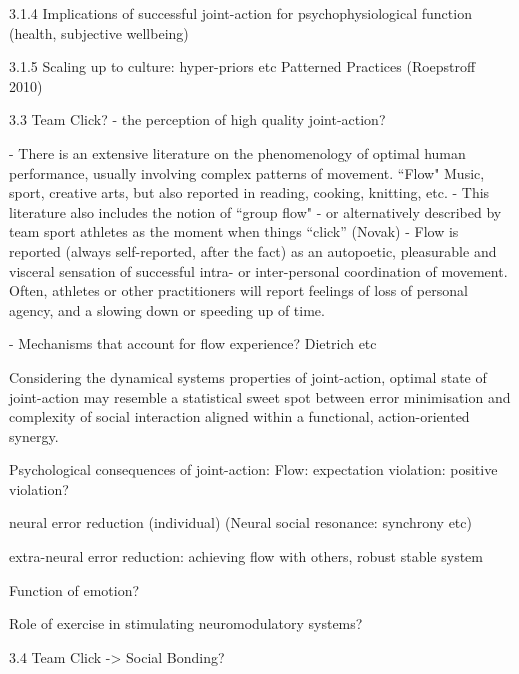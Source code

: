  3.1.4 Implications of successful joint-action for psychophysiological function (health, subjective wellbeing)


3.1.5 Scaling up to culture: hyper-priors etc Patterned Practices (Roepstroff 2010)





















3.3 Team Click? - the perception of high quality joint-action?


- There is an extensive literature on the phenomenology of optimal human performance, usually involving complex patterns of movement. ``Flow"  Music, sport, creative arts, but also reported in reading, cooking, knitting, etc.
- This literature also includes the notion of ``group flow" - or alternatively described by team sport athletes as the moment when things ``click'' (Novak)
- Flow is reported (always self-reported, after the fact) as an autopoetic, pleasurable and visceral sensation of successful intra- or inter-personal coordination of movement.  Often, athletes or other practitioners will report feelings of loss of personal agency, and a slowing down or speeding up of time.

- Mechanisms that account for flow experience? Dietrich etc



Considering the dynamical systems properties of joint-action, optimal state of joint-action may resemble a statistical sweet spot between error minimisation and complexity of social interaction aligned within a functional, action-oriented synergy.




Psychological consequences of joint-action:
Flow:
expectation violation: positive violation?


neural error reduction (individual) (Neural social resonance: synchrony etc)

extra-neural error reduction: achieving flow with others, robust stable system

Function of emotion?

Role of exercise in stimulating neuromodulatory systems?






    3.4 Team Click -> Social Bonding?




